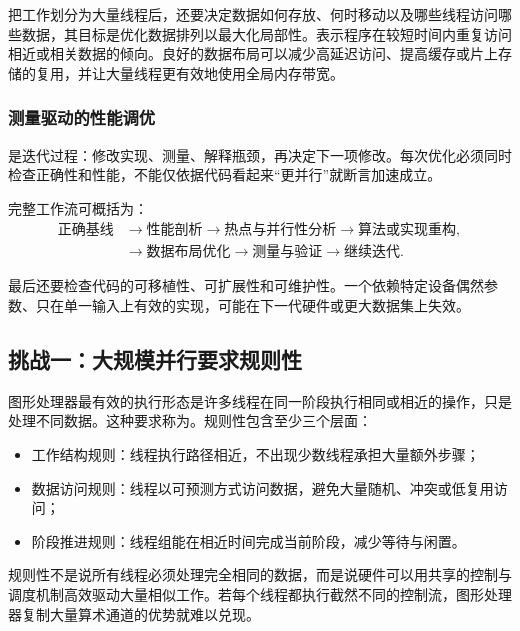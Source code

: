 把工作划分为大量线程后，还要决定数据如何存放、何时移动以及哪些线程访问哪些数据，其目标是优化数据排列以最大化局部性。表示程序在较短时间内重复访问相近或相关数据的倾向。良好的数据布局可以减少高延迟访问、提高缓存或片上存储的复用，并让大量线程更有效地使用全局内存带宽。

\subsubsection{测量驱动的性能调优}

是迭代过程：修改实现、测量、解释瓶颈，再决定下一项修改。每次优化必须同时检查正确性和性能，不能仅依据代码看起来“更并行”就断言加速成立。

完整工作流可概括为：
\begin{equation*}
\begin{aligned}
\text{正确基线}
&\rightarrow \text{性能剖析}
\rightarrow \text{热点与并行性分析}
\rightarrow \text{算法或实现重构},\\
&\rightarrow \text{数据布局优化}
\rightarrow \text{测量与验证}
\rightarrow \text{继续迭代}.
\end{aligned}
\end{equation*}

最后还要检查代码的可移植性、可扩展性和可维护性。一个依赖特定设备偶然参数、只在单一输入上有效的实现，可能在下一代硬件或更大数据集上失效。

\subsection{挑战一：大规模并行要求规则性}

图形处理器最有效的执行形态是许多线程在同一阶段执行相同或相近的操作，只是处理不同数据。这种要求称为。规则性包含至少三个层面：
\begin{itemize}
  \item 工作结构规则：线程执行路径相近，不出现少数线程承担大量额外步骤；
  \item 数据访问规则：线程以可预测方式访问数据，避免大量随机、冲突或低复用访问；
  \item 阶段推进规则：线程组能在相近时间完成当前阶段，减少等待与闲置。
\end{itemize}

规则性不是说所有线程必须处理完全相同的数据，而是说硬件可以用共享的控制与调度机制高效驱动大量相似工作。若每个线程都执行截然不同的控制流，图形处理器复制大量算术通道的优势就难以兑现。

